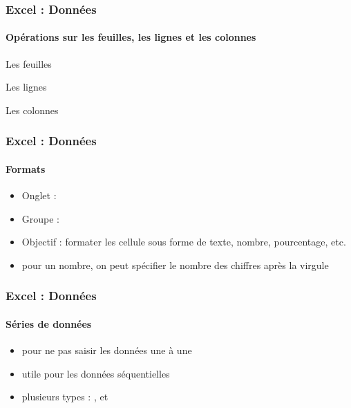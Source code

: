 \documentclass[xcolor=table, usenames,dvipsnames]{beamer}
\begin{document}
\begin{frame}
\frametitle{Excel : Données}
\framesubtitle{Opérations sur les feuilles, les lignes et les colonnes}

\begin{minipage}{0.40\textwidth}
	Les feuilles
	
\end{minipage}
\begin{minipage}{0.28\textwidth}
	Les lignes
	
\end{minipage}
\begin{minipage}{0.25\textwidth}
	Les colonnes
	
\end{minipage}

\end{frame}

\begin{frame}[t]
\frametitle{Excel : Données}
\framesubtitle{Formats}

\begin{minipage}{0.5\textwidth}
	\begin{itemize}
		\item Onglet : 
		\item Groupe : 
		\item Objectif : formater les cellule sous forme de texte, nombre, pourcentage, etc.
		\item pour un nombre, on peut spécifier le nombre des chiffres après la virgule
	\end{itemize}
\end{minipage}
%
\begin{minipage}{0.49\textwidth}
\end{minipage}

\end{frame}

\begin{frame}
\frametitle{Excel : Données}
\framesubtitle{Séries de données}

\begin{minipage}{0.34\textwidth}
	\begin{itemize}
		\item pour ne pas saisir les données une à une
		\item utile pour les données séquentielles 
		\item plusieurs types : ,  et 
	\end{itemize}
\end{minipage}
%
\begin{minipage}{0.65\textwidth}
\end{minipage}


\end{frame}
\end{document}
